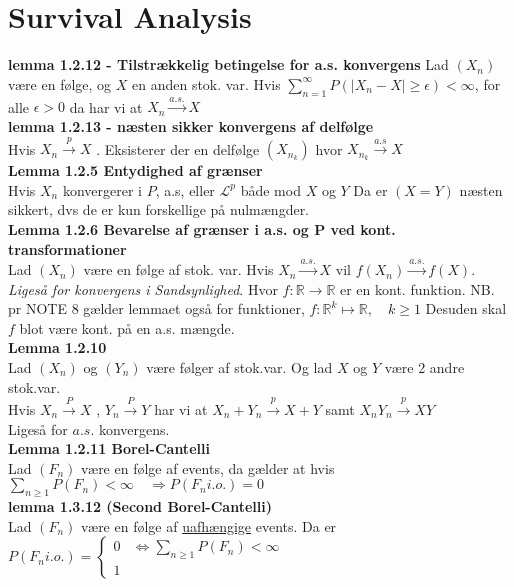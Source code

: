 \section*{Survival Analysis}
\textbf{lemma 1.2.12 - Tilstrækkelig betingelse for a.s. konvergens}\newline
Lad $(X_n)$ være en følge, og $X$ en anden stok. var. Hvis $\sum_{n=1}^\infty P(|X_n-X|\geq \epsilon) < \infty$, for alle $\epsilon>0$ da har vi  at $X_n \xrightarrow{a.s.} X$ \newline \\ 
\textbf{lemma 1.2.13 - næsten sikker konvergens af delfølge}\\
Hvis $X_n \xrightarrow{p} X$ . Eksisterer der en delfølge $ \left(X_{n_k}\right)$ hvor 
$X_{n_k} \xrightarrow{a.s} X $\newline \\
\textbf{Lemma 1.2.5 Entydighed af grænser}\\
Hvis $X_n$ konvergerer i $P$, a.s, eller $\mathcal{L}^p$ både mod $X$ og $Y$ Da er $\left(X=Y\right)$ næsten sikkert, dvs de er kun forskellige på nulmængder.\newline \\
\textbf{Lemma 1.2.6 Bevarelse af grænser i a.s. og P ved kont. transformationer}\\
Lad $(X_n)$ være en følge af stok. var. Hvis $X_n \xrightarrow{a.s.} X$ vil $f(X_n) \xrightarrow{a.s.} f(X)$. \textit{Ligeså for konvergens i Sandsynlighed}. Hvor $f:\mathbb{R} \to \mathbb{R}$ er en kont. funktion.
NB. pr NOTE 8 gælder lemmaet også for funktioner, $f:\mathbb{R}^k \mapsto \mathbb{R},\quad k\geq 1$ 
Desuden skal $f$ blot være kont. på en a.s. mængde.
\newline \\ 
\textbf{Lemma 1.2.10}\\
Lad $\left(X_n\right)$ og $\left(Y_n\right)$ være følger af stok.var. Og lad $X$ og $Y$ være 2 andre stok.var.\\
Hvis $X_n \xrightarrow{P} X$ , $Y_n \xrightarrow{P} Y$ har vi at $X_n + Y_n \xrightarrow{p} X+Y$ samt $X_nY_n \xrightarrow{p} XY$\\ 
Ligeså for $a.s.$ konvergens.\newline \\  
\textbf{Lemma 1.2.11 Borel-Cantelli}\\
Lad $\left(F_n\right)$ være en følge af events, da gælder at hvis $\sum_{n\geq1}P(F_n) < \infty\quad \Longrightarrow P(F_n i.o.)=0$\newline \\
\textbf{lemma 1.3.12 (Second Borel-Cantelli)}\\
Lad $\left(F_n\right)$ være en følge af \underline{uafhængige}  events. Da er $P(F_n i.o.) = \begin{cases} 0 & \Longleftrightarrow \sum_{n\geq 1}P(F_n) < \infty \\ 
1 \end{cases}$
\newpage
